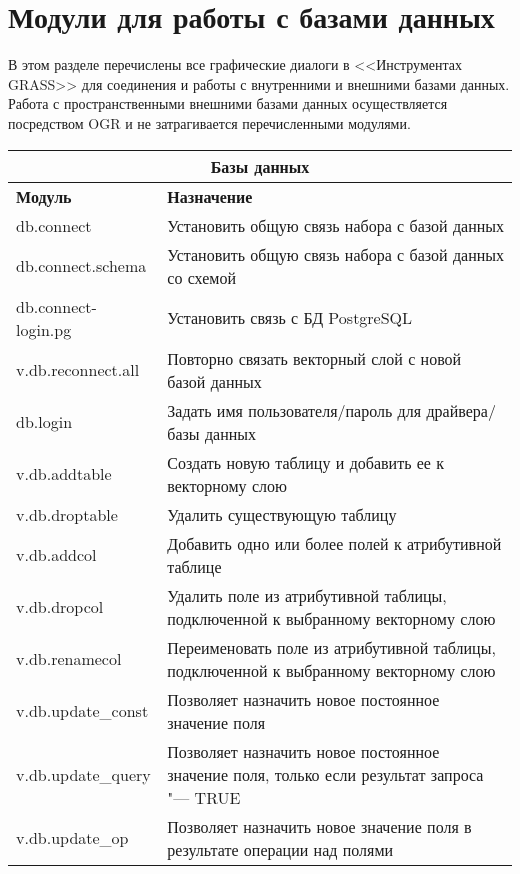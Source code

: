 \clearpage

\section{Модули для работы с базами данных}

В этом разделе перечислены все графические диалоги в <<Инструментах
GRASS>> для соединения и работы с внутренними и внешними
базами данных. Работа с пространственными внешними базами данных
осуществляется посредством OGR и не затрагивается перечисленными модулями.

{\renewcommand{\arraystretch}{0.7}
\begin{table}[H]
\centering
 \begin{tabular}{|p{4cm}|p{11cm}|}
  \hline \multicolumn{2}{|c|}{\textbf{Базы данных}} \\
  \hline \textbf{Модуль} & \textbf{Назначение} \\
  \hline db.connect & Установить общую связь набора с базой данных \\
  \hline db.connect.schema & Установить общую связь набора с базой
  данных со схемой \\
  \hline db.connect-login.pg & Установить связь с БД PostgreSQL \\
  \hline v.db.reconnect.all & Повторно связать векторный слой с новой базой
  данных \\
  \hline db.login & Задать имя пользователя/пароль для драйвера/базы
  данных \\
  \hline v.db.addtable & Создать новую таблицу и добавить ее к
  векторному слою \\
  \hline v.db.droptable & Удалить существующую таблицу \\
  \hline v.db.addcol & Добавить одно или более полей к атрибутивной
  таблице \\
  \hline v.db.dropcol & Удалить поле из атрибутивной таблицы,
  подключенной к выбранному векторному слою \\
  \hline v.db.renamecol & Переименовать поле из атрибутивной таблицы,
  подключенной к выбранному векторному слою \\
  \hline v.db.update\_const & Позволяет назначить новое постоянное
  значение поля \\
  \hline v.db.update\_query & Позволяет назначить новое постоянное
  значение поля, только если результат запроса "--- TRUE \\
  \hline v.db.update\_op & Позволяет назначить новое значение поля в
  результате операции над полями \\

\end{tabular}
\end{table}}
